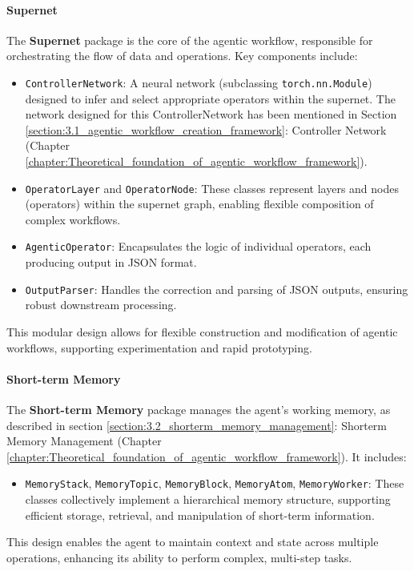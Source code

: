 \documentclass[../Main.tex]{subfiles}
\begin{document}
	\paragraph{Supernet}
	The \textbf{Supernet} package is the core of the agentic workflow, responsible
	for orchestrating the flow of data and operations. Key components include:
	\begin{itemize}
		\item \texttt{ControllerNetwork}: A neural network (subclassing \texttt{torch.nn.Module})
			designed to infer and select appropriate operators within the supernet. The
			network designed for this ControllerNetwork has been mentioned in Section \ref{section:3.1_agentic_workflow_creation_framework}:
			Controller Network (Chapter \ref{chapter:Theoretical_foundation_of_agentic_workflow_framework}).

		\item \texttt{OperatorLayer} and \texttt{OperatorNode}: These classes
			represent layers and nodes (operators) within the supernet graph, enabling
			flexible composition of complex workflows.

		\item \texttt{AgenticOperator}: Encapsulates the logic of individual operators,
			each producing output in JSON format.

		\item \texttt{OutputParser}: Handles the correction and parsing of JSON outputs,
			ensuring robust downstream processing.
	\end{itemize}
	This modular design allows for flexible construction and modification of agentic
	workflows, supporting experimentation and rapid prototyping.
	\paragraph{Short-term Memory}
	The \textbf{Short-term Memory} package manages the agent's working memory, as
	described in section \ref{section:3.2_shorterm_memory_management}: Shorterm Memory
	Management (Chapter
	\ref{chapter:Theoretical_foundation_of_agentic_workflow_framework}). It
	includes:
	\begin{itemize}
		\item \texttt{MemoryStack}, \texttt{MemoryTopic}, \texttt{MemoryBlock}, \texttt{MemoryAtom},
			\texttt{MemoryWorker}: These classes collectively implement a hierarchical
			memory structure, supporting efficient storage, retrieval, and
			manipulation of short-term information.
	\end{itemize}
	This design enables the agent to maintain context and state across multiple operations,
	enhancing its ability to perform complex, multi-step tasks.
\end{document}
